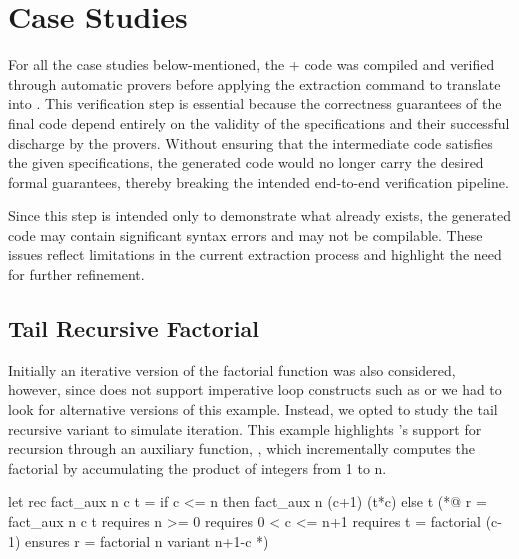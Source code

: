 

\section{Case Studies}

For all the case studies below-mentioned, the \ocaml + \gospel code was compiled and verified through \whythree automatic
provers before applying the extraction command to translate into \cml. This verification step is essential because the correctness 
guarantees of the final \cml code depend entirely on the validity of the specifications and their successful discharge by the 
provers. Without ensuring that the \whyml intermediate code satisfies the given specifications, the generated \cml code would 
no longer carry the desired formal guarantees, thereby breaking the intended end-to-end verification pipeline.

Since this step is intended only to demonstrate what already exists, the generated code may contain significant syntax errors 
and may not be compilable. These issues reflect limitations in the current extraction process and highlight the need for 
further refinement.

\subsection{Tail Recursive Factorial}

Initially an iterative version of the factorial function was also considered, however, since \cml does not support imperative loop 
constructs such as  or  we had to look for alternative versions of this example. Instead, we opted 
to study the tail recursive variant to simulate iteration. This example highlights \ocaml's support for recursion through an auxiliary 
function, , which incrementally computes the factorial by accumulating the product of integers from 1 to n.

\begin{gospell}
let rec fact_aux n c t =
  if c <= n then fact_aux n (c+1) (t*c) else t
(*@
  r = fact_aux n c t
  requires n >= 0
  requires 0 < c <= n+1
  requires t = factorial (c-1)
  ensures r = factorial n
  variant n+1-c
*)
\end{gospell}

